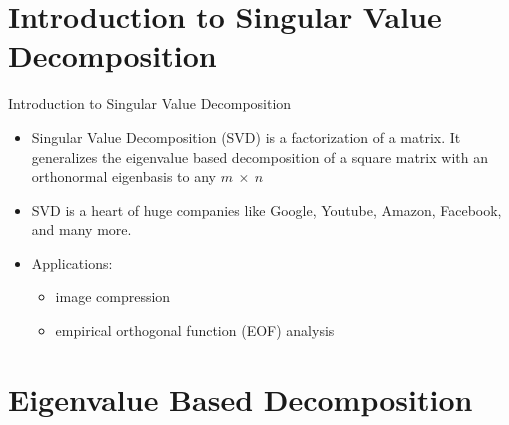 \section{Introduction to Singular Value Decomposition}                                               

\begin{frame}[t]{Introduction to Singular Value Decomposition}

    \begin{itemize}
        \item Singular Value Decomposition (SVD) is a factorization of a matrix.
            It generalizes the eigenvalue based decomposition of a square matrix with an
            orthonormal eigenbasis to any $m~\times~n$
        \item SVD is a heart of huge companies like Google, Youtube, Amazon,
            Facebook, and many more.
        \item Applications:

            \begin{itemize}
                \item image compression
                \item empirical orthogonal function (EOF) analysis    
            \end{itemize}

    \end{itemize}

\end{frame}


\section{Eigenvalue Based Decomposition}

